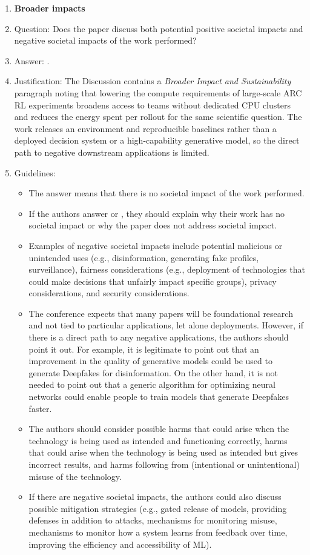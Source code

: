 \begin{enumerate}
\item {\bf Broader impacts}
    \item[] Question: Does the paper discuss both potential positive societal impacts and negative societal impacts of the work performed?
    \item[] Answer: \answerYes{}.
    \item[] Justification: The Discussion contains a \emph{Broader Impact and Sustainability} paragraph noting that lowering the compute requirements of large-scale ARC RL experiments broadens access to teams without dedicated CPU clusters and reduces the energy spent per rollout for the same scientific question. The work releases an environment and reproducible baselines rather than a deployed decision system or a high-capability generative model, so the direct path to negative downstream applications is limited.
    \item[] Guidelines:
    \begin{itemize}
        \item The answer \answerNA{} means that there is no societal impact of the work performed.
        \item If the authors answer \answerNA{} or \answerNo, they should explain why their work has no societal impact or why the paper does not address societal impact.
        \item Examples of negative societal impacts include potential malicious or unintended uses (e.g., disinformation, generating fake profiles, surveillance), fairness considerations (e.g., deployment of technologies that could make decisions that unfairly impact specific groups), privacy considerations, and security considerations.
        \item The conference expects that many papers will be foundational research and not tied to particular applications, let alone deployments. However, if there is a direct path to any negative applications, the authors should point it out. For example, it is legitimate to point out that an improvement in the quality of generative models could be used to generate Deepfakes for disinformation. On the other hand, it is not needed to point out that a generic algorithm for optimizing neural networks could enable people to train models that generate Deepfakes faster.
        \item The authors should consider possible harms that could arise when the technology is being used as intended and functioning correctly, harms that could arise when the technology is being used as intended but gives incorrect results, and harms following from (intentional or unintentional) misuse of the technology.
        \item If there are negative societal impacts, the authors could also discuss possible mitigation strategies (e.g., gated release of models, providing defenses in addition to attacks, mechanisms for monitoring misuse, mechanisms to monitor how a system learns from feedback over time, improving the efficiency and accessibility of ML).
    \end{itemize}
    

\end{enumerate}
